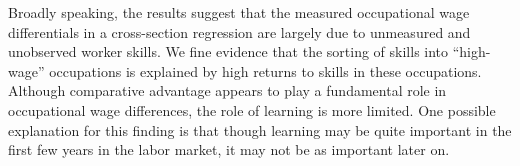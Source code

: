 \documentclass[12pt]{article}
\newcommand{\CiteReference}{../reference.bib}
\theoremstyle{definition}
\begin{document}
Broadly speaking, the results suggest that the measured occupational wage differentials in a cross-section regression are largely due to unmeasured and unobserved worker skills. We fine evidence that the sorting of skills into ``high-wage'' occupations is explained by high returns to skills in these occupations. Although comparative advantage appears to play a fundamental role in occupational wage differences, the role of learning is more limited. One possible explanation for this finding is that though learning may be quite important in the first few years in the labor market, it may not be as important later on.







\end{document}
